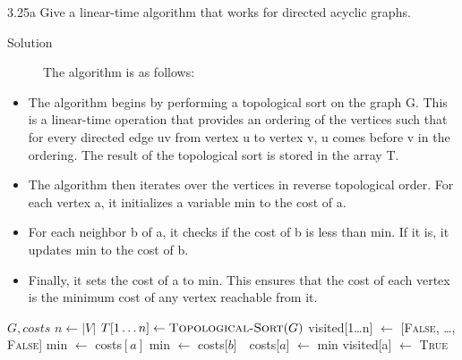 \documentclass[boxes]{rutgers_hw}
\author{Rohan Karamel} %
\date{\today} %
\begin{document}
    \maketitle

    \begin{exern}{3.25a}
        Give a linear-time algorithm that works for directed acyclic graphs.
    \end{exern}

    \begin{description}
        \item[Solution] The algorithm is as follows: 
    \end{description}

    \begin{itemize}
        \item The algorithm begins by performing a topological sort on the graph G. This is a linear-time operation that provides an ordering of the vertices such that for every directed edge uv from vertex u to vertex v, u comes before v in the ordering. The result of the topological sort is stored in the array T.
        \item The algorithm then iterates over the vertices in reverse topological order. For each vertex a, it initializes a variable min to the cost of a.
        \item For each neighbor b of a, it checks if the cost of b is less than min. If it is, it updates min to the cost of b.
        \item Finally, it sets the cost of a to min. This ensures that the cost of each vertex is the minimum cost of any vertex reachable from it.
    \end{itemize}

    \pagebreak

    \begin{algorithmic}
         {$G, costs$}
            \State$n \gets |V|$
            \State$T[1\dots n] \gets \textsc{Topological-Sort}(G)$
            \State$ $visited[1\dots n] $\gets$ [\textsc{False}, \dots, \textsc{False}]
                    \State$ $min $\gets$ costs$[a]$
                            \State$ $min $\gets$ costs[$b$]
                        \EndIf$ $
                    \EndFor$ $
                    \State$ $costs[$a$] $\gets$ min
                    \State$ $visited[a] $\gets$ \textsc{True}
                \EndIf$ $
            \EndFor{}
        \EndProcedure{}
    \end{algorithmic}
\end{document}
